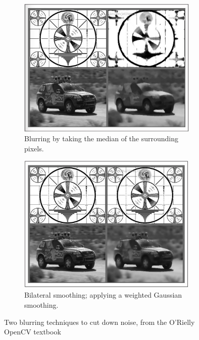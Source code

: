 \begin{figure}[h]
\centering
\begin{subfigure}{0.4\textwidth}
 \centering
 \includegraphics[width=0.95\textwidth]{"./image/median_blurring"}
 \caption{Blurring by taking the median of the surrounding pixels.}
 \label{fig:blurring:sub1}
\end{subfigure}
\begin{subfigure}{0.4\textwidth}
 \centering
 \includegraphics[width=0.95\textwidth]{"./image/bilateral_smoothing"}
 \caption{Bilateral smoothing; applying a weighted Gaussian smoothing.}
 \label{fig:blurring:sub2}
\end{subfigure}
\caption{Two blurring techniques to cut down noise, from the O'Rielly OpenCV textbook}
\label{fig:blurring}
\end{figure}

